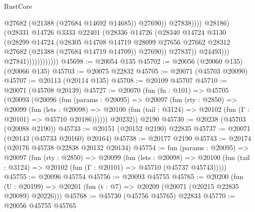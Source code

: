 \begin{lexlean}{RustCore}
\begin{coremodule}
                                              @27682
                                              (@21388 (@27684 @14692 @14685))
                                              @27690))
                                          @27838))))
                                  @28186)
                                (@28331
                                  @14726
                                  @3333
                                  @22401
                                  (@28336
                                    @14726
                                    (@28340
                                      @14724
                                      @3130
                                      (@28299
                                        @14724
                                        (@28305
                                          @14708
                                          @14719
                                          @28099
                                          @27656
                                          @27662
                                          @28312
                                          @27682
                                          (@21388 (@27684 @14719 @14709))
                                          @27690))
                                      @27837))
                                  @24493)))
                            @27841))))))))))))
@45698 := @20054 @135
@45702 := @20056 (@20060 @135) (@20066 @135)
@45703 := @20075 @22832
@45705 := @20071 (@45703 @20090)
@45707 := @20113 (@20114 @135)
@45708 := @20109 @45707
@45710 := @20071 (@45708 @20139)
@45727 := @20070
    (fun (fn : @101) =>
    @45705
      (@20093
        (@20096
          (fun (params : @20095) =>
          @20097
            (fun (rty : @2850) =>
            @20099
              (fun (lets : @20098) =>
              @20100 (fun (tail : @3124) => @20102 (fun (Γ : @20101) => @45710 @20186))))))
        @20232))
    @2190
@45730 := @20238 (@45703 (@20088 @2190))
@45733 := @20151 (@20152 @2190) @22835
@45737 := @20071 (@20143 (@45733 @20160) @20164)
@45738 := @20177 @2190
@45743 := @20174 (@20176 @45738 @22838 @20132 @20134)
@45754 := fun (params : @20095) =>
  @20097
    (fun (rty : @2850) =>
    @20099
      (fun (lets : @20098) =>
      @20100 (fun (tail : @3124) => @20102 (fun (Γ : @20101) => @45710 (@45737 @45743)))))
@45755 := @20096 @45754
@45756 := @20093 @45755
@45765 := @20200
    (fun (U : @20199) => @20201 (fun (t : @7) => @20209 (@20071 (@20215 @22835 @20089) @20226)))
@45768 := @45730 (@45756 @45765) @22833
@45770 := @20056 @45755 @45765

\end{coremodule}
\end{lexlean}
